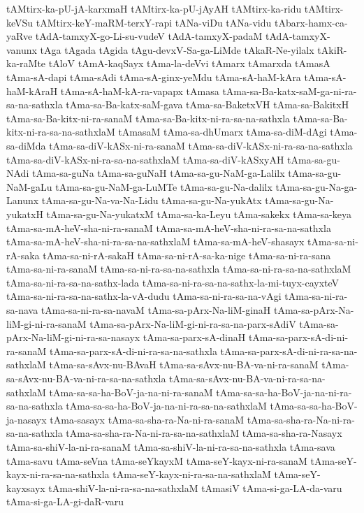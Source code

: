 {tAMtirx-ka-pU-jA-karxmaH
tAMtirx-ka-pU-jAyAH
tAMtirx-ka-ridu
tAMtirx-keVSu
tAMtirx-keY-maRM-terxY-rapi
tANa-viDu
tANa-vidu
tAbarx-hamx-ca-yaRve
tAdA-tamxyX-go-Li-su-vudeV
tAdA-tamxyX-padaM
tAdA-tamxyX-vanunx
tAga
tAgada
tAgida
tAgu-devxV-Sa-ga-LiMde
tAkaR-Ne-yilalx
tAkiR-ka-raMte
tAloV
tAmA-kaqSayx
tAma-la-deVvi
tAmarx
tAmarxda
tAmasA
tAma-sA-dapi
tAma-sAdi
tAma-sA-ginx-yeMdu
tAma-sA-haM-kAra
tAma-sA-haM-kAraH
tAma-sA-haM-kA-ra-vapapx
tAmasa
tAma-sa-Ba-katx-saM-ga-ni-ra-sa-na-sathxla
tAma-sa-Ba-katx-saM-gava
tAma-sa-BaketxVH
tAma-sa-BakitxH
tAma-sa-Ba-kitx-ni-ra-sanaM
tAma-sa-Ba-kitx-ni-ra-sa-na-sathxla
tAma-sa-Ba-kitx-ni-ra-sa-na-sathxlaM
tAmasaM
tAma-sa-dhUmarx
tAma-sa-diM-dAgi
tAma-sa-diMda
tAma-sa-diV-kASx-ni-ra-sanaM
tAma-sa-diV-kASx-ni-ra-sa-na-sathxla
tAma-sa-diV-kASx-ni-ra-sa-na-sathxlaM
tAma-sa-diV-kASxyAH
tAma-sa-gu-NAdi
tAma-sa-guNa
tAma-sa-guNaH
tAma-sa-gu-NaM-ga-Lalilx
tAma-sa-gu-NaM-gaLu
tAma-sa-gu-NaM-ga-LuMTe
tAma-sa-gu-Na-dalilx
tAma-sa-gu-Na-ga-Lanunx
tAma-sa-gu-Na-va-Na-Lidu
tAma-sa-gu-Na-yukAtx
tAma-sa-gu-Na-yukatxH
tAma-sa-gu-Na-yukatxM
tAma-sa-ka-Leyu
tAma-sakekx
tAma-sa-keya
tAma-sa-mA-heV-sha-ni-ra-sanaM
tAma-sa-mA-heV-sha-ni-ra-sa-na-sathxla
tAma-sa-mA-heV-sha-ni-ra-sa-na-sathxlaM
tAma-sa-mA-heV-shasayx
tAma-sa-ni-rA-saka
tAma-sa-ni-rA-sakaH
tAma-sa-ni-rA-sa-ka-nige
tAma-sa-ni-ra-sana
tAma-sa-ni-ra-sanaM
tAma-sa-ni-ra-sa-na-sathxla
tAma-sa-ni-ra-sa-na-sathxlaM
tAma-sa-ni-ra-sa-na-sathx-lada
tAma-sa-ni-ra-sa-na-sathx-la-mi-tuyx-cayxteV
tAma-sa-ni-ra-sa-na-sathx-la-vA-dudu
tAma-sa-ni-ra-sa-na-vAgi
tAma-sa-ni-ra-sa-nava
tAma-sa-ni-ra-sa-navaM
tAma-sa-pArx-Na-liM-ginaH
tAma-sa-pArx-Na-liM-gi-ni-ra-sanaM
tAma-sa-pArx-Na-liM-gi-ni-ra-sa-na-parx-sAdiV
tAma-sa-pArx-Na-liM-gi-ni-ra-sa-nasayx
tAma-sa-parx-sA-dinaH
tAma-sa-parx-sA-di-ni-ra-sanaM
tAma-sa-parx-sA-di-ni-ra-sa-na-sathxla
tAma-sa-parx-sA-di-ni-ra-sa-na-sathxlaM
tAma-sa-sAvx-nu-BAvaH
tAma-sa-sAvx-nu-BA-va-ni-ra-sanaM
tAma-sa-sAvx-nu-BA-va-ni-ra-sa-na-sathxla
tAma-sa-sAvx-nu-BA-va-ni-ra-sa-na-sathxlaM
tAma-sa-sa-ha-BoV-ja-na-ni-ra-sanaM
tAma-sa-sa-ha-BoV-ja-na-ni-ra-sa-na-sathxla
tAma-sa-sa-ha-BoV-ja-na-ni-ra-sa-na-sathxlaM
tAma-sa-sa-ha-BoV-ja-nasayx
tAma-sasayx
tAma-sa-sha-ra-Na-ni-ra-sanaM
tAma-sa-sha-ra-Na-ni-ra-sa-na-sathxla
tAma-sa-sha-ra-Na-ni-ra-sa-na-sathxlaM
tAma-sa-sha-ra-Nasayx
tAma-sa-shiV-la-ni-ra-sanaM
tAma-sa-shiV-la-ni-ra-sa-na-sathxla
tAma-sava
tAma-savu
tAma-seVna
tAma-seYkayxM
tAma-seY-kayx-ni-ra-sanaM
tAma-seY-kayx-ni-ra-sa-na-sathxla
tAma-seY-kayx-ni-ra-sa-na-sathxlaM
tAma-seY-kayxsayx
tAma-shiV-la-ni-ra-sa-na-sathxlaM
tAmasiV
tAma-si-ga-LA-da-varu
tAma-si-ga-LA-gi-daR-varu
}

